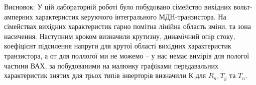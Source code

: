 \documentclass[a4paper,14pt]{extreport}
\begin{document}




Висновок: У цій лабораторній роботі було побудовано сімейство вихідних вольт-амперних характеристик керуючого інтегрального МДН-транзистора.  На сімействах вихідних характеристик 
гарно помітна лінійна область зміни, та зона насичення.
Наступним кроком визначили крутизну, динамiчний опiр стоку, коефiцiєнт пiдсилення напруги для крутої області вихiдних характеристик транзистора, а от для поллогої ми не можемо -- у нас немає вимірів для пологої частини ВАХ, за побудованими на малюнку графiками передавальних характеристик знятих для трьох типiв iнверторiв визначили К для $R_{n}, T_{y} $ та  $ T_{n}$.
\end{document}
